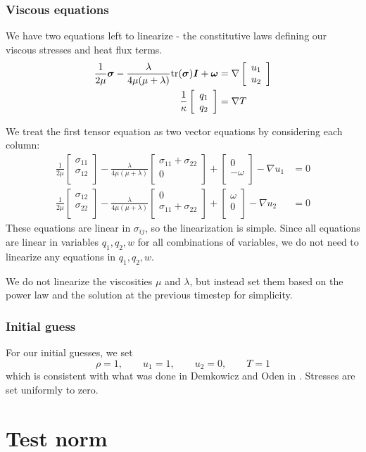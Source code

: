 \documentclass{article}
\newcommand{\grad}{\nabla}
\def\vecttwo#1#2{\left[
\begin{array}{c}
#1\\
#2\\
\end{array}
\right]}
\begin{document}
\subsubsection{Viscous equations}
We have two equations left to linearize - the constitutive laws defining our viscous stresses and heat flux terms. 
\begin{align*}
\frac{1}{2\mu}{\boldsymbol \sigma}- \frac{\lambda}{4\mu(\mu+\lambda)}{\rm tr}({\boldsymbol \sigma}){\boldsymbol I} + {\boldsymbol \omega} &= 
\grad
\left[\begin{array}{c}
u_1\\
u_2
\end{array}
\right]\\
\frac{1}{\kappa}
\left[\begin{array}{c}
q_1\\
q_2
\end{array}\right] &=
\grad T
\end{align*}

We treat the first tensor equation as two vector equations by considering each column:
\begin{align*}
\frac{1}{2\mu} \vecttwo{\sigma_{11}}{\sigma_{12}} - \frac{\lambda}{4\mu(\mu+\lambda)}\vecttwo{\sigma_{11}+\sigma_{22}}{0} + \vecttwo{0}{-\omega} - \grad u_1&= 0 \\
\frac{1}{2\mu} \vecttwo{\sigma_{12}}{\sigma_{22}} - \frac{\lambda}{4\mu(\mu+\lambda)}\vecttwo{0}{\sigma_{11}+\sigma_{22}} + \vecttwo{\omega}{0} - \grad u_2 &= 0
\end{align*}
These equations are linear in $\sigma_{ij}$, so the linearization is simple. 
Since all equations are linear in variables $q_1, q_2, w$ for all combinations of variables, we do not need to linearize any equations in $q_1, q_2, w$. 

We do not linearize the viscosities $\mu$ and $\lambda$, but instead set them based on the power law and the solution at the previous timestep for simplicity. 

\subsubsection{Initial guess}

For our initial guesses, we set
\[
\rho = 1,\qquad u_1= 1,\qquad u_2 = 0, \qquad T = 1
\]
which is consistent with what was done in Demkowicz and Oden in \cite{Demkowicz:1990:NFE:112271.112276}. Stresses are set uniformly to zero.

\section{Test norm}
\end{document}
